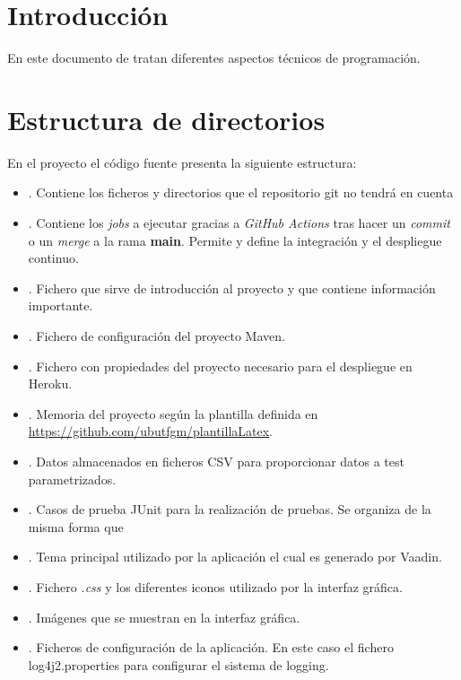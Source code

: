 \label{anex:D}

\section{Introducción}
En este documento de tratan diferentes aspectos técnicos de programación.

\section{Estructura de directorios}
En el proyecto el código fuente presenta la siguiente estructura:
\begin{itemize}
	\tightlist
	\item {}. Contiene los ficheros y directorios que el repositorio git no tendrá en cuenta
	\item {}. Contiene los \textit{jobs} a ejecutar gracias a \textit{GitHub Actions} tras hacer un \textit{commit} o un \textit{merge} a la rama \textbf{main}. Permite y define la integración y el despliegue continuo.
	\item {}. Fichero que sirve de introducción al proyecto y que contiene información importante.
	\item {}. Fichero de configuración del proyecto Maven.
	\item {}. Fichero con propiedades del proyecto necesario para el despliegue en Heroku.
	\item {}. Memoria del proyecto según la plantilla definida en \url{https://github.com/ubutfgm/plantillaLatex}.
	\item {}. Datos almacenados en ficheros CSV para proporcionar datos a test parametrizados.
	\item {}. Casos de prueba JUnit para la realización de pruebas. Se organiza de la misma forma que 
	\item {}. Tema principal utilizado por la aplicación el cual es generado por Vaadin.
	\item {}. Fichero \textit{.css} y los diferentes iconos utilizado por la interfaz gráfica.
	\item {}. Imágenes que se muestran en la interfaz gráfica.
	\item {}. Ficheros de configuración de la aplicación. En este caso el fichero log4j2.properties para configurar el sistema de logging.

\end{itemize}
